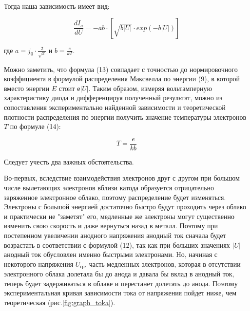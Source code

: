 Тогда наша зависимость имеет вид:

\begin{equation}
    \frac{dI_a}{dU} = -ab \cdot
    \left[
    \sqrt{b|U|} \cdot exp(-b|U|)
    \right]
    \label{major_func}
\end{equation}

где $a = j_0 \cdot \frac{2}{\sqrt{\pi}}$ и $b = \frac{e}{kT}$.

\par 
Можно заметить, что формула (13) совпадает с точностью до
нормировочного коэффициента в формулой распределения Максвелла по энергии
(9), в которой вместо энергии $E$ стоит $е|U|$. Таким образом, измеряя
вольтамперную характеристику диода и дифференцируя полученный результат,
можно из сопоставления экспериментально найденной зависимости и
теоретической плотности распределения по энергии получить значение
температуры электронов $T$ по формуле (14):

\begin{equation}
    T = \frac{e}{kb}
\end{equation}




\par
Следует учесть два важных обстоятельства.
\par
Во-первых, вследствие взаимодействия электронов друг с другом при
большом числе вылетающих электронов вблизи катода образуется отрицательно
заряженное электронное облако, поэтому распределение будет изменяться.
Электроны с большой энергией достаточно быстро будут проходить через облако
и практически не "заметят" его, медленные же электроны могут существенно
изменить свою скорость и даже вернуться назад в металл. Поэтому при
постепенном увеличении анодного напряжения анодный ток сначала будет
возрастать в соответствии с формулой (12), так как при больших значениях $|U|$
анодный ток обусловлен именно быстрыми электронами. Но, начиная с
некоторого напряжения $U_\text{гр}$, часть медленных электронов, которая в отсутствии
электронного облака долетала бы до анода и давала бы вклад в анодный ток,
теперь будет задерживаться в облаке и перестанет долетать до анода. Поэтому
экспериментальная кривая зависимости тока от напряжения пойдет ниже, чем
теоретическая (рис.\ref{fig:graph_toka}).



